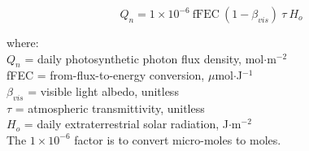 \begin{equation}
\label{eq:dayppfd}
	Q_n = 1 \times 10^{-6}\: \text{fFEC}\: 
	\left(1-\beta_{vis}\right)\: \tau\: H_o
\end{equation}

\noindent where: \\
\indent $Q_n$ = daily photosynthetic photon flux density, mol$\cdot$m$^{-2}$\\
\indent fFEC = from-flux-to-energy conversion, $\mu$mol$\cdot$J$^{-1}$\\
\indent $\beta_{vis}$ = visible light albedo, unitless \\
\indent $\tau$ = atmospheric transmittivity, unitless \\
\indent $H_o$ = daily extraterrestrial solar radiation, J$\cdot$m$^{-2}$\\

\noindent The $1\times 10^{-6}$ factor is to convert micro-moles to moles.

